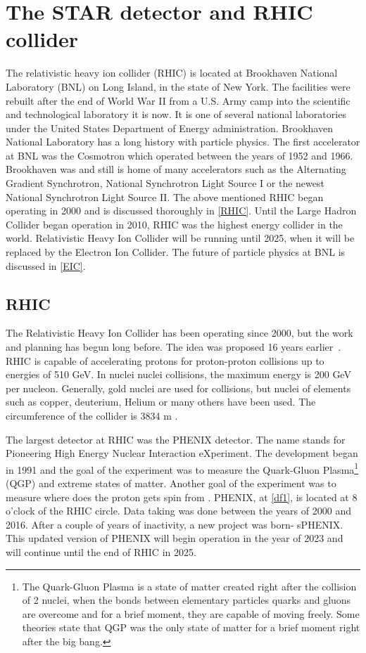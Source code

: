 \chapter{The STAR detector and RHIC collider}
\label{detector}
The relativistic heavy ion collider (RHIC) is located at Brookhaven National Laboratory (BNL) on Long Island, in the state of New York. The facilities were rebuilt after the end of World War II from a U.S. Army camp into the scientific and technological laboratory it is now. It is one of several national laboratories under the United States Department of Energy administration. 
\newline
Brookhaven National Laboratory has a long history with particle physics. The first accelerator at BNL was the Cosmotron which operated between the years of 1952 and 1966. Brookhaven was and still is home of many accelerators such as the Alternating Gradient Synchrotron, National Synchrotron Light Source I or the newest National Synchrotron Light Source II. The above mentioned RHIC began operating in 2000 and is discussed thoroughly in \autoref{RHIC}. Until the Large Hadron Collider began operation in 2010, RHIC was the highest energy collider in the world. Relativistic Heavy Ion Collider will be running until 2025, when it will be replaced by the Electron Ion Collider. The future of particle physics at BNL is discussed in \autoref{EIC}.

\section{RHIC}
\label{RHIC}
The Relativistic Heavy Ion Collider has been operating since 2000, but the work and planning has begun long before. The idea was proposed 16 years earlier~\cite{RHIChis}. RHIC is capable of accelerating protons for proton-proton collisions up to energies of 510 GeV. In nuclei nuclei collisions, the maximum energy is 200 GeV per nucleon. Generally, gold nuclei are used for collisions, but nuclei of elements such as copper, deuterium, Helium or many others have been used. The circumference of the collider is 3834 m \cite{Dehmelt}.

The largest detector at RHIC was the PHENIX detector. The name stands for Pioneering High Energy Nuclear Interaction eXperiment. The development began in 1991 and the goal of the experiment was to measure the Quark-Gluon Plasma\footnote{The Quark-Gluon Plasma is a state of matter created right after the collision of 2 nuclei, when the bonds between elementary particles quarks and gluons are overcome and for a brief moment, they are capable of moving freely. Some theories state that QGP was the only state of matter for a brief moment right after the big bang.} (QGP) and extreme states of matter. Another goal of the experiment was to measure where does the proton gets spin from \cite{PHENIX}.  PHENIX, at \autoref{df1}, is located at 8 o'clock of the RHIC circle. Data taking was done between the years of 2000 and 2016. After a couple of years of inactivity, a new project was born- sPHENIX. This updated version of PHENIX will begin operation in the year of 2023 and will continue until the end of RHIC in 2025. 

